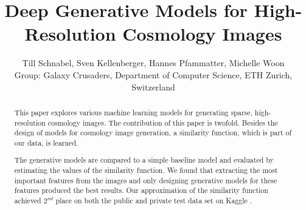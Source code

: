 \documentclass[10pt,conference,compsocconf]{IEEEtran}
\newcommand\TODO[1]{\textcolor{red}{#1}} %
\begin{document}
\title{Deep Generative Models for High-Resolution Cosmology Images}

\author{Till Schnabel, Sven Kellenberger, Hannes Pfammatter, Michelle Woon \\Group: Galaxy Crusaders, Department of Computer Science, ETH Zurich, Switzerland}

\maketitle

\begin{abstract}
This paper explores various machine learning models for generating sparse, high-resolution cosmology images. %
The contribution of this paper is twofold. Besides the design of models for cosmology image generation, a similarity function, which is part of our data, is learned.

The generative models are compared to a simple baseline model and evaluated by estimating the values of the similarity function. We found that extracting the most important features from the images and only designing generative models for these features produced the best results. Our approximation of the similarity function achieved $2^{nd}$ place on both the public and private test data set on Kaggle \cite{Kaggle}.




\end{abstract}
\end{document}
